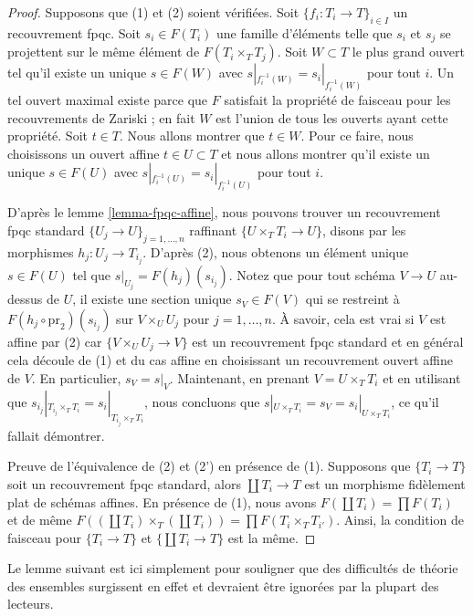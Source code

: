 \begin{proof}
Supposons que (1) et (2) soient vérifiées. Soit $\{f_i : T_i \to T\}_{i \in I}$ un recouvrement fpqc. Soit $s_i \in F(T_i)$ une famille d'éléments telle que $s_i$ et $s_j$ se projettent sur le même élément de $F(T_i \times_T T_j)$. Soit $W \subset T$ le plus grand ouvert tel qu'il existe un unique $s \in F(W)$ avec $s|_{f_i^{-1}(W)} = s_i|_{f_i^{-1}(W)}$ pour tout $i$. Un tel ouvert maximal existe parce que $F$ satisfait la propriété de faisceau pour les recouvrements de Zariski ; en fait $W$ est l'union de tous les ouverts ayant cette propriété. Soit $t \in T$. Nous allons montrer que $t \in W$. Pour ce faire, nous choisissons un ouvert affine $t \in U \subset T$ et nous allons montrer qu'il existe un unique $s \in F(U)$ avec $s|_{f_i^{-1}(U)} = s_i|_{f_i^{-1}(U)}$ pour tout $i$.

\medskip\noindent
D'après le lemme \ref{lemma-fpqc-affine}, nous pouvons trouver un recouvrement fpqc standard $\{U_j \to U\}_{j = 1, \ldots, n}$ raffinant $\{U \times_T T_i \to U\}$, disons par les morphismes $h_j : U_j \to T_{i_j}$. D'après (2), nous obtenons un élément unique $s \in F(U)$ tel que $s|_{U_j} = F(h_j)(s_{i_j})$. Notez que pour tout schéma $V \to U$ au-dessus de $U$, il existe une section unique $s_V \in F(V)$ qui se restreint à $F(h_j \circ \text{pr}_2)(s_{i_j})$ sur $V \times_U U_j$ pour $j = 1, \ldots, n$. À savoir, cela est vrai si $V$ est affine par (2) car $\{V \times_U U_j \to V\}$ est un recouvrement fpqc standard et en général cela découle de (1) et du cas affine en choisissant un recouvrement ouvert affine de $V$. En particulier, $s_V = s|_V$. Maintenant, en prenant $V = U \times_T T_i$ et en utilisant que $s_{i_j}|_{T_{i_j} \times_T T_i} = s_i|_{T_{i_j} \times_T T_i}$, nous concluons que $s|_{U \times_T T_i} = s_V = s_i|_{U \times_T T_i}$, ce qu’il fallait démontrer.

\medskip\noindent
Preuve de l'équivalence de (2) et (2') en présence de (1). Supposons que $\{T_i \to T\}$ soit un recouvrement fpqc standard, alors $\coprod T_i \to T$ est un morphisme fidèlement plat de schémas affines. En présence de (1), nous avons $F(\coprod T_i) = \prod F(T_i)$ et de même $F((\coprod T_i) \times_T (\coprod T_i)) = \prod F(T_i \times_T T_{i'})$. Ainsi, la condition de faisceau pour $\{T_i \to T\}$ et $\{\coprod T_i \to T\}$ est la même.
\end{proof}


\noindent
Le lemme suivant est ici simplement pour souligner que des difficultés de théorie des ensembles surgissent en effet et devraient être ignorées par la plupart des lecteurs.

